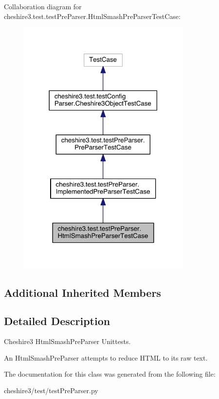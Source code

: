Collaboration diagram for cheshire3.\-test.\-test\-Pre\-Parser.\-Html\-Smash\-Pre\-Parser\-Test\-Case\-:
\nopagebreak
\begin{figure}[H]
\begin{center}
\leavevmode
\includegraphics[width=246pt]{classcheshire3_1_1test_1_1test_pre_parser_1_1_html_smash_pre_parser_test_case__coll__graph}
\end{center}
\end{figure}
\subsection*{Additional Inherited Members}


\subsection{Detailed Description}
\begin{DoxyVerb}Cheshire3 HtmlSmashPreParser Unittests.

An HtmlSmashPreParser attempts to reduce HTML to its raw text.
\end{DoxyVerb}
 

The documentation for this class was generated from the following file\-:\begin{DoxyCompactItemize}
\item 
cheshire3/test/test\-Pre\-Parser.\-py\end{DoxyCompactItemize}
